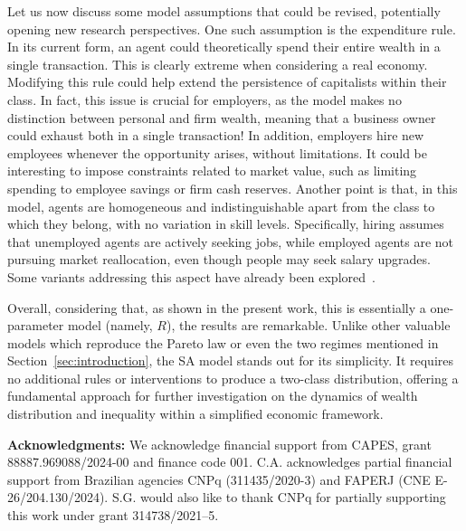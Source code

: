 \documentclass[11pt,a4paper]{revtex4-1}
\begin{document}
 Let us now discuss some model assumptions that could be revised, potentially opening new research perspectives. 
One such assumption is the expenditure rule. In its current form, an agent could theoretically spend their entire wealth in a single transaction. This is clearly extreme when considering a real economy. 
%
Modifying this rule could help extend the persistence of capitalists within their class. 
In fact, this issue is crucial for employers, as the model makes no distinction between personal and firm wealth, meaning that a business owner could exhaust both in a single transaction! 
In addition, employers hire new employees whenever the opportunity arises, without limitations. It could be interesting to impose constraints related to market value, such as limiting spending to employee savings or firm cash reserves.  Another point is that, in this model, agents are homogeneous and indistinguishable apart from the class to which they belong, with no variation in skill levels. Specifically, hiring assumes that unemployed agents are actively seeking jobs, while employed agents are not pursuing market reallocation, even though people may seek salary upgrades. Some variants addressing this aspect have already been explored~\cite{WRIGHT2010}. 
 
Overall, considering that, as shown in the present work, this is essentially a one-parameter model (namely, $R$),  the results are remarkable. 
Unlike other valuable models which reproduce the Pareto law or even the two regimes mentioned in Section~\ref{sec:introduction}, the SA model stands out for its simplicity. It requires no additional rules or interventions to produce a two-class distribution, offering a fundamental approach for further investigation on the dynamics of wealth distribution and inequality within a simplified economic framework.
 
 

{\bf Acknowledgments:}
We acknowledge financial support from CAPES, grant 88887.969088/2024-00 and finance code 001. 
C.A. acknowledges partial financial support from Brazilian agencies CNPq (311435/2020-3) and FAPERJ  (CNE E-26/204.130/2024). S.G. would also like to thank CNPq for partially supporting this work under grant 314738/2021–5.


\end{document}
